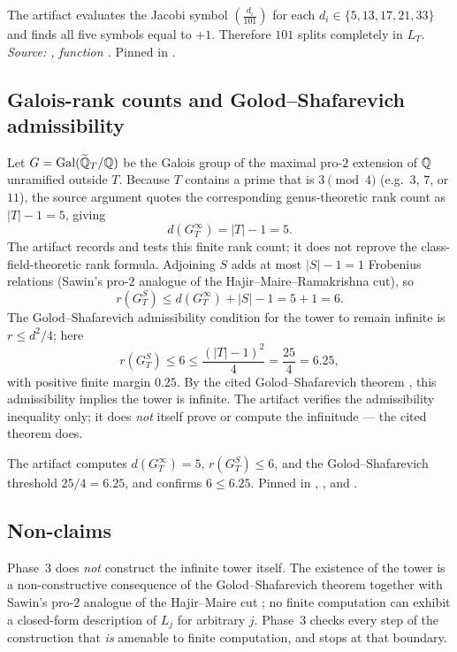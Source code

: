 \begin{verification}\label{ver:101_splits}
The artifact evaluates the Jacobi symbol
$\left(\frac{d_i}{101}\right)$ for each
$d_i \in \{5, 13, 17, 21, 33\}$ and finds all five symbols equal to
$+1$. Therefore $101$ splits completely in $L_T$.
\textit{Source: ,
function .}
Pinned in
.
\end{verification}

\subsection{Galois-rank counts and Golod--Shafarevich admissibility}

Let $G = \operatorname{Gal}(\widetilde{\mathbb{Q}}_T / \mathbb{Q})$ be the Galois group of the maximal
pro-$2$ extension of $\mathbb{Q}$ unramified outside $T$. Because $T$ contains a
prime that is $3 \pmod 4$ (e.g.\ $3$, $7$, or $11$), the source
argument quotes the corresponding genus-theoretic rank count as
$|T| - 1 = 5$,
giving
\[
  d(G_T^\infty) = |T| - 1 = 5.
\]
The artifact records and tests this finite rank count; it does not
reprove the class-field-theoretic rank formula.
Adjoining $S$ adds at most $|S| - 1 = 1$ Frobenius relations
(Sawin's pro-$2$ analogue of the Hajir--Maire--Ramakrishna cut), so
\[
  r(G_T^S) \leq d(G_T^\infty) + |S| - 1 = 5 + 1 = 6.
\]
The Golod--Shafarevich admissibility condition for the tower to remain
infinite is $r \leq d^2 / 4$; here
\[
  r(G_T^S) \leq 6 \leq \frac{(|T| - 1)^2}{4} = \frac{25}{4} = 6.25,
\]
with positive finite margin $0.25$. By the cited Golod--Shafarevich theorem
\cite{GolodShafarevich1964}, this admissibility implies the tower is
infinite. The artifact verifies the admissibility inequality only; it
does \emph{not} itself prove or compute the infinitude --- the cited
theorem does.

\begin{verification}\label{ver:gs_admissible}
The artifact computes $d(G_T^\infty) = 5$, $r(G_T^S) \leq 6$, and the
Golod--Shafarevich threshold $25/4 = 6.25$, and confirms
$6 \leq 6.25$. Pinned in
,
, and
.
\end{verification}

\subsection{Non-claims}

Phase~3 does \emph{not} construct the infinite tower itself. The
existence of the tower is a non-constructive consequence of the
Golod--Shafarevich theorem \cite{GolodShafarevich1964} together with
Sawin's pro-$2$ analogue of the Hajir--Maire cut
\cite{HajirMaire2001,Sawin2026Remarks}; no finite computation can
exhibit a closed-form description of $L_j$ for arbitrary $j$. Phase~3
checks every step of the construction that \emph{is} amenable to finite
computation, and stops at that boundary.
